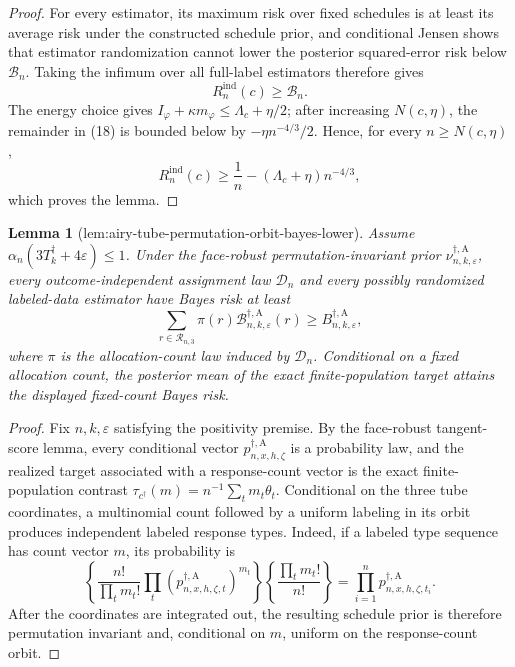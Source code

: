 \documentclass{article}
\newtheorem{lemma}{Lemma}
\begin{document}
{\begin{proof}
For every estimator, its maximum risk over fixed schedules is at least its average risk under the constructed schedule prior, and conditional Jensen shows that estimator randomization cannot lower the posterior squared-error risk below \(\mathcal B_n\).  Taking the infimum over all full-label estimators therefore gives
\[
R_n^{\mathrm{ind}}(c)\ge\mathcal B_n.
\]
The energy choice gives
\(I_\varphi+\kappa m_\varphi\le\Lambda_c+\eta/2\); after increasing \(N(c,\eta)\), the remainder in (18) is bounded below by \(-\eta n^{-4/3}/2\).  Hence, for every \(n\ge N(c,\eta)\),
\[
R_n^{\mathrm{ind}}(c)
\ge\frac1n-(\Lambda_c+\eta)n^{-4/3},
\]
which proves the lemma.
\end{proof}

\begin{lemma}[lem:airy-tube-permutation-orbit-bayes-lower]\label{lem:airy-tube-permutation-orbit-bayes-lower}
Assume \(\alpha_n(3T_k^\dagger+4\varepsilon)\le1\).  Under the face-robust permutation-invariant prior
\(\nu_{n,k,\varepsilon}^{\dagger,\mathrm A}\), every outcome-independent assignment law \(\mathcal D_n\) and every possibly randomized labeled-data estimator have Bayes risk at least
\[
\sum_{r\in\mathcal R_{n,3}}\pi(r)
\mathcal B_{n,k,\varepsilon}^{\dagger,\mathrm A}(r)
\ge B_{n,k,\varepsilon}^{\dagger,\mathrm A},
\]
where \(\pi\) is the allocation-count law induced by \(\mathcal D_n\).  Conditional on a fixed allocation count, the posterior mean of the exact finite-population target attains the displayed fixed-count Bayes risk.
\end{lemma}
\begin{proof}
Fix \(n,k,\varepsilon\) satisfying the positivity premise.  By the face-robust
tangent-score lemma, every conditional vector
\(p_{n,x,h,\zeta}^{\dagger,\mathrm A}\) is a probability law, and the realized
target associated with a response-count vector is the exact finite-population
contrast \(\tau_{c^\dagger}(m)=n^{-1}\sum_tm_t\theta_t\).  Conditional on the
three tube coordinates, a multinomial count followed by a uniform labeling in its
orbit produces independent labeled response types.  Indeed, if a labeled type
sequence has count vector \(m\), its probability is
\[
 \left\{\frac{n!}{\prod_tm_t!}\prod_t
 (p_{n,x,h,\zeta,t}^{\dagger,\mathrm A})^{m_t}\right\}
 \left\{\frac{\prod_tm_t!}{n!}\right\}
 =\prod_{i=1}^np_{n,x,h,\zeta,t_i}^{\dagger,\mathrm A}.
\tag{1}
\]
After the coordinates are integrated out, the resulting schedule prior is therefore
permutation invariant and, conditional on \(m\), uniform on the response-count
orbit.


\end{proof}}
\end{document}
